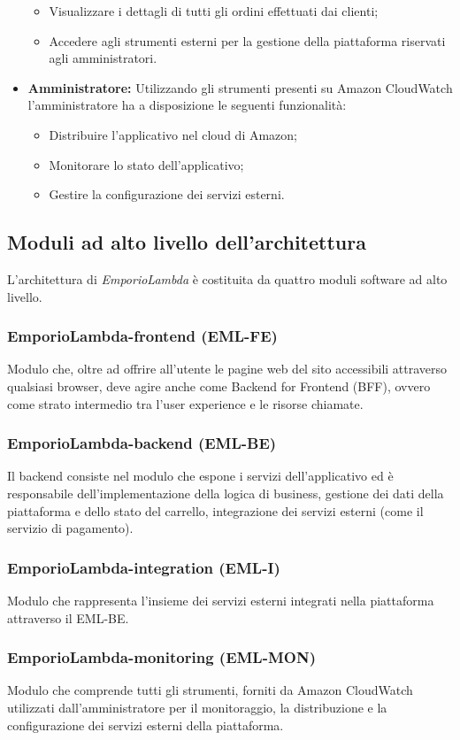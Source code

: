 \begin{itemize}
\begin{itemize}
	\item Visualizzare i dettagli di tutti gli ordini effettuati dai clienti;
	\item Accedere agli strumenti esterni per la gestione della piattaforma riservati agli amministratori.
	\end{itemize}
\item \textbf{Amministratore:} Utilizzando gli strumenti presenti su Amazon CloudWatch l'amministratore ha a disposizione le seguenti funzionalità:
	\begin{itemize}
	\item Distribuire l'applicativo nel cloud di Amazon;
	\item Monitorare lo stato dell'applicativo;
	\item Gestire la configurazione dei servizi esterni.
	\end{itemize}
\end{itemize}
\subsection{Moduli ad alto livello dell'architettura}
L'architettura di \textit{EmporioLambda} è costituita da quattro moduli software ad alto livello.
\subsubsection{EmporioLambda-frontend (EML-FE)}
Modulo che, oltre ad offrire all'utente le pagine web del sito accessibili attraverso qualsiasi browser, deve agire anche come Backend for Frontend (BFF), ovvero come strato intermedio tra l'user experience e le risorse chiamate.
\subsubsection{EmporioLambda-backend (EML-BE)}
Il backend consiste nel modulo che espone i servizi dell'applicativo ed è responsabile dell'implementazione della logica di business, gestione dei dati della piattaforma e dello stato del carrello, integrazione dei servizi esterni (come il servizio di pagamento).
\subsubsection{EmporioLambda-integration (EML-I)}
Modulo che rappresenta l'insieme dei servizi esterni integrati nella piattaforma attraverso il EML-BE.
\subsubsection{EmporioLambda-monitoring (EML-MON)}
Modulo che comprende tutti gli strumenti, forniti da Amazon CloudWatch utilizzati dall'amministratore per il monitoraggio, la distribuzione e la configurazione dei servizi esterni della piattaforma.
